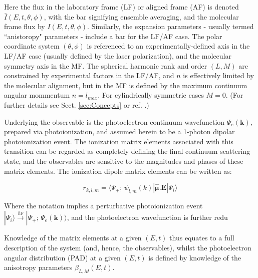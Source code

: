 Here the flux in the laboratory frame (LF) or aligned frame (AF) is denoted $\bar{I}(E,t,\theta,\phi)$, with the bar signifying ensemble averaging, and the molecular frame flux by $I(E,t,\theta,\phi)$. Similarly, the expansion parameters - usually termed ``anistoropy" parameters - include a bar for the LF/AF case. The polar coordinate system $(\theta,\phi)$ is referenced to an experimentally-defined axis in the LF/AF case (usually defined by the laser polarization), and the molecular symmetry axis in the MF. The spherical harmonic rank and order $(L,M)$ are constrained by experimental factors in the LF/AF, and $n$ is effectively limited by the molecular alignment, but in the MF is defined by the maximum continuum angular mommentum $n=l_{max}$. For cylindrically symmetric cases $M=0$. (For further details see Sect. \ref{sec:Concepts} or ref. \cite{hockett2018QMP1}.)

Underlying the observable is the photoelectron continuum wavefunction $\Psi_{e}(\boldsymbol{\mathbf{k}})$, prepared via photoionization, and assumed herein to be a 1-photon dipolar photoionization event. The ionization matrix elements associated with this transition can be regarded as completely defining the final continuum scattering state, and the observables are sensitive to the magnitudes and phases of these matrix elements. The ionization dipole matrix elements can be written as:

\begin{equation}
r_{k,l,m}=\langle\Psi_{+};\,\psi_{l,m}(k)|\hat{\mathbf{\mu}}.\boldsymbol{\mathbf{E}}|\Psi_{i}\rangle\label{eq:r-kllam}
\end{equation}

Where the notation implies a perturbative photoionization event $|\Psi_{i}\rangle\stackrel{h\nu}{\rightarrow}|\Psi_{+};\,\Psi_{e}(\boldsymbol{\mathbf{k}})\rangle$, and the photoelectron wavefunction is further redu

Knowledge of the matrix elements at a given $(E,t)$ thus equates to a full description of the system (and, hence, the observables), whilst the photoelectron angular distribution (PAD) at a given $(E,t)$ is defined by knowledge of the anisotropy parameters $\beta_{L,M}(E,t)$.

